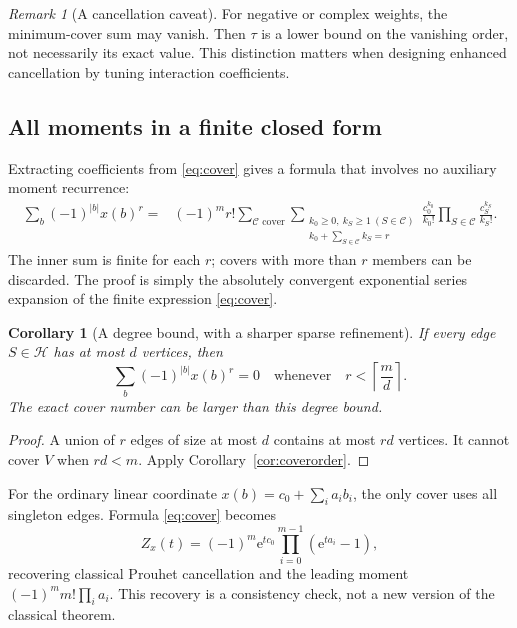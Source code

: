 \documentclass[11pt,oneside]{article}
\numberwithin{equation}{section}
\newtheorem{corollary}[theorem]{Corollary}
\theoremstyle{definition}
\theoremstyle{remark}
\newtheorem{remark}[theorem]{Remark}
\newcommand{\HH}{\mathcal H}
\newcommand{\CCov}{\mathcal C}
\newcommand{\e}{\mathrm e}
\begin{document}
\begin{remark}[A cancellation caveat]
For negative or complex weights, the minimum-cover sum may vanish. Then
\(\tau\) is a lower bound on the vanishing order, not necessarily its exact
value. This distinction matters when designing enhanced cancellation by tuning
interaction coefficients.
\end{remark}

\subsection{All moments in a finite closed form}
Extracting coefficients from \eqref{eq:cover} gives a formula that involves no
auxiliary moment recurrence:
\begin{equation}
\begin{split}
 \sum_b(-1)^{|b|}x(b)^r
  ={}&(-1)^m r!\sum_{\CCov\text{ cover}}
       \sum_{\substack{k_0\ge0,\ k_S\ge1\ (S\in\CCov)\\
                       k_0+\sum_{S\in\CCov}k_S=r}}
       \frac{c_0^{k_0}}{k_0!}
       \prod_{S\in\CCov}\frac{c_S^{k_S}}{k_S!}.
\end{split}
\label{eq:allmoments}
\end{equation}
The inner sum is finite for each \(r\); covers with more than \(r\) members
can be discarded. The proof is simply the absolutely convergent exponential
series expansion of the finite expression \eqref{eq:cover}.

\begin{corollary}[A degree bound, with a sharper sparse refinement]
If every edge \(S\in\HH\) has at most \(d\) vertices, then
\begin{equation}
 \sum_b(-1)^{|b|}x(b)^r=0
 \quad\text{whenever}\quad r<\left\lceil\frac md\right\rceil.
 \label{eq:degreebound}
\end{equation}
The exact cover number can be larger than this degree bound.
\end{corollary}
\begin{proof}
A union of \(r\) edges of size at most \(d\) contains at most \(rd\) vertices.
It cannot cover \(V\) when \(rd<m\). Apply Corollary~\ref{cor:coverorder}.
\end{proof}

For the ordinary linear coordinate \(x(b)=c_0+\sum_i a_i b_i\), the only cover
uses all singleton edges. Formula \eqref{eq:cover} becomes
\begin{equation}
 Z_x(t)=(-1)^m\e^{tc_0}\prod_{i=0}^{m-1}(\e^{ta_i}-1),
 \label{eq:classicalprouhet}
\end{equation}
recovering classical Prouhet cancellation and the leading moment
\((-1)^m m!\prod_i a_i\). This recovery is a consistency check, not a new
version of the classical theorem.
\end{document}
